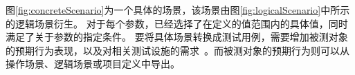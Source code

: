 图\ref{fig:concreteScenario}为一个具体的场景，该场景由图\ref{fig:logicalScenario}中所示的逻辑场景衍生。
对于每个参数，已经选择了在定义的值范围内的具体值，同时满足了关于参数的指定条件。
要将具体场景转换成测试用例，需要增加被测对象的预期行为表现，以及对相关测试设施的需求~\cite{ulbrich_definition_2015}。而被测对象的预期行为则可以从操作场景、逻辑场景或项目定义中导出。
%
%

%

